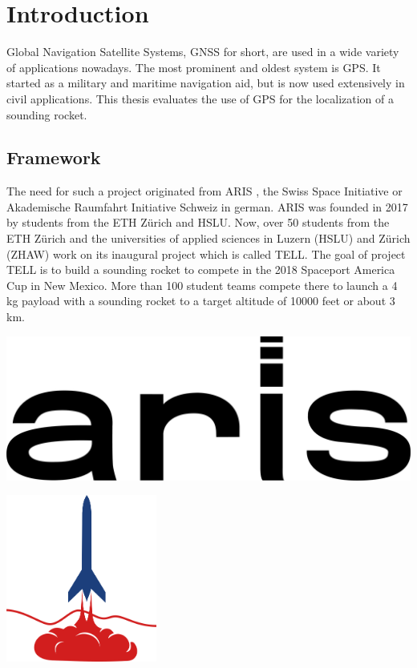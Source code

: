 \chapter{Introduction}

Global Navigation Satellite Systems, GNSS for short, are used in a wide variety of applications nowadays.
The most prominent and oldest system is GPS.
It started as a military and maritime navigation aid, but is now used extensively in civil applications.
This thesis evaluates the use of GPS for the localization of a sounding rocket.

\section{Framework}

The need for such a project originated from ARIS \cite{aris}, the Swiss Space Initiative or Akademische Raumfahrt Initiative Schweiz in german.
ARIS was founded in 2017 by students from the ETH Z\"urich and HSLU.
Now, over 50 students from the ETH Z\"urich and the universities of applied sciences in Luzern (HSLU) and Z\"urich (ZHAW) work on its inaugural project which is called TELL.
The goal of project TELL is to build a sounding rocket to compete in the 2018 Spaceport America Cup in New Mexico.
More than 100 student teams compete there to launch a 4 kg payload with a sounding rocket to a target altitude of 10000 feet or about 3 km.

\noindent
\begin{minipage}{0.5\textwidth}
 \centering
 \includegraphics[width=\textwidth]{images/ARIS.png}
\end{minipage}
\begin{minipage}{0.5\textwidth}
 \centering
 \includegraphics[height=5.5cm]{images/SAC_Logo.png}
\end{minipage}

